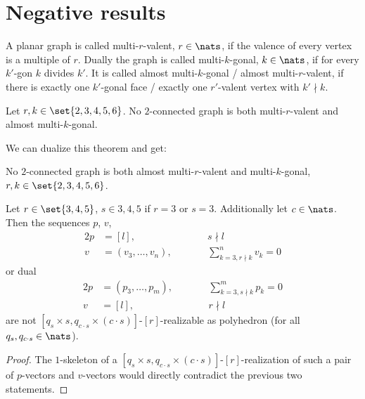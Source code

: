 \section{Negative results}

\begin{definition} A planar graph is called multi-$r$-valent, $r \in \nats$, if the valence of every vertex is a multiple of $r$. Dually the graph is called multi-$k$-gonal, $k \in \nats$, if for every $k'$-gon $k$ divides $k'$. It is called almost multi-$k$-gonal / almost multi-$r$-valent, if there is exactly one $k'$-gonal face / exactly one $r'$-valent vertex with $k' \nmid k$.
\end{definition}

\begin{theorem} Let $r, k \in \set{2, 3, 4, 5, 6}$. No $2$-connected graph is both multi-$r$-valent and almost multi-$k$-gonal.
\end{theorem}

We can dualize this theorem and get:
\begin{corollary} No $2$-connected graph is both almost multi-$r$-valent and multi-$k$-gonal, $r, k \in \set{2, 3, 4, 5, 6}$.
\end{corollary}

\begin{corollary}
  Let $r \in \set{3, 4, 5}$, $s \in {3, 4, 5}$ if $r = 3$ or $s = 3$. Additionally let $c \in \nats$. Then the sequences $p$, $v$,
  \begin{alignat*}{2}
    p &= [l], & \qquad&s \nmid l \\
    v &= (v_3, \dots, v_n), & &\sum_{k = 3, r \nmid k}^n v_k = 0
  \end{alignat*}
  or dual
  \begin{alignat*}{2}
    p &= (p_3, \dots, p_m), & \qquad&\sum_{k = 3, s \nmid k}^m p_k = 0\\
    v &= [l], & &r \nmid l
  \end{alignat*}
  are not $[q_s \times s, q_{c \cdot s} \times (c \cdot s)]$-$[r]$-realizable as polyhedron (for all $q_s, q_{c \cdot s} \in \nats$).
\begin{proof}
  The $1$-skeleton of a $[q_s \times s, q_{c \cdot s} \times (c \cdot s)]$-$[r]$-realization of such a pair of $p$-vectors and $v$-vectors would directly contradict the previous two statements.
\end{proof}
\end{corollary}

